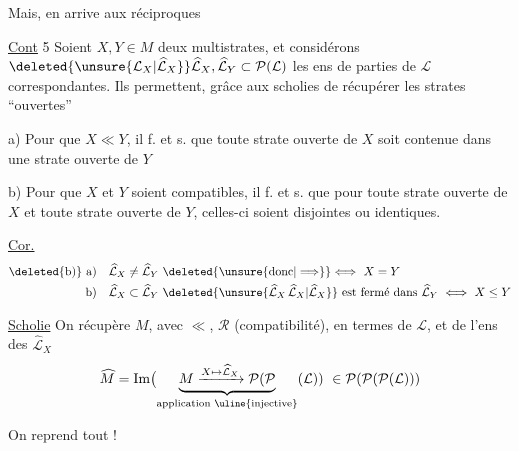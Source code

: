 Mais,  en arrive aux réciproques


\uline{Cont} 5 Soient $X,Y\in M$ deux multistrates, et considérons $\deleted{\unsure{\mathcal{L}_X|\widehat{\mathcal{L}}_X}}\widehat{\mathcal{L}}_X,\widehat{\mathcal{L}}_Y\subset\mathcal P(\mathcal{L})$ les ens de parties de $\mathcal{L}$ correspondantes. Ils permettent, grâce aux scholies de récupérer les strates ``ouvertes''

a) Pour que $X\ll Y$, il f. et s. que  toute strate ouverte de $X$ soit contenue dans une strate ouverte de $Y$


b) Pour que $X$ et $Y$ soient compatibles, il f. et s. que pour toute strate ouverte de $X$ et toute strate ouverte de $Y$,  celles-ci soient disjointes ou identiques.

\uline{Cor.}
\[
\begin{aligned}
\text{\deleted{b)} a)}\quad &\widehat{\mathcal{L}}_X\ne\widehat{\mathcal{L}}_Y\ \deleted{\unsure{\text{donc}|\Longrightarrow}}\Longleftrightarrow\ X=Y\\
\text{b)}\quad &\widehat{\mathcal{L}}_X\subset\widehat{\mathcal{L}}_Y\ \deleted{\unsure{\widehat{\mathcal{L}}_X\,\widehat{\mathcal{L}}_X|\widehat{\mathcal{L}}_X}}\ \text{est fermé dans }\widehat{\mathcal{L}}_Y\ \Longleftrightarrow\ X\leq Y
\end{aligned}
\]

\uline{Scholie} On récupère $M$, avec $\ll$, $\mathcal R$ (compatibilité), en termes de $\mathcal{L}$, et de l'ens  des $\widehat{\mathcal{L}}_X$
\[
\widehat M=\operatorname{Im}\bigl(\underbrace{M\xrightarrow{X\mapsto\widehat{\mathcal{L}}_X}\mathcal P(\mathcal P}_{\text{application \uline{injective}}}(\mathcal{L}))\ \in\mathcal P(\mathcal P(\mathcal P(\mathcal{L})))
\]

On reprend tout !

